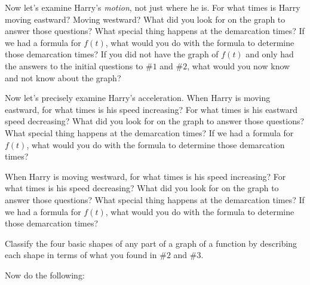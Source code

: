 \documentclass{ximera}
\begin{document}
\begin{exploration}
Now let’s examine Harry's {\em motion}, not just where he is.  For what times is Harry moving eastward?  Moving westward?  What did you look for on the graph to answer those questions?  What special thing happens at the demarcation times?  If we had a formula for $f(t)$, what would you do with the formula to determine those demarcation times?  If you did not have the graph of $f(t)$ and only had the answers to the initial questions to $\#1$ and $\#2$, what would you now know and not know about the graph?

\end{exploration}

\begin{exploration}
     Now let's precisely examine Harry's acceleration.  When Harry is moving eastward, for what times is his speed increasing?  For what times is his eastward speed decreasing?  What did you look for on the graph to answer those questions?  What special thing happens at the demarcation times?  If we had a formula for $f(t)$, what would you do with the formula to determine those demarcation times?          
\end{exploration}


\begin{exploration}
     When Harry is moving westward, for what times is his speed increasing?  For what times is his speed decreasing?  What did you look for on the graph to answer those questions?  What special thing happens at the demarcation times?  If we had a formula for $f(t)$, what would you do with the formula to determine those demarcation times?
\end{exploration}

\begin{exploration}
     Classify the four basic shapes of any part of a graph of a function by describing each shape in terms of what you found in $\#2$ and $\#3$.
\end{exploration}

Now do the following:
\end{document}
